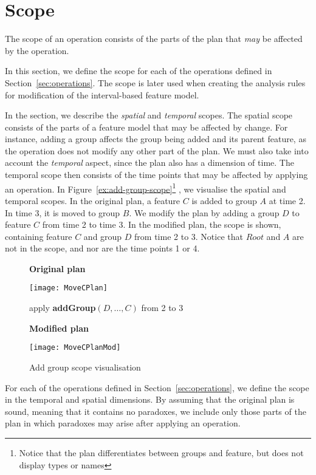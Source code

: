 
\section{Scope}
\label{sec:scope}

The scope of an operation consists of the parts of the plan that \emph{may} be affected by the operation.

In this section, we define the scope for each of the operations defined in Section~\vref{sec:operations}. The scope is later used when creating the analysis rules for modification of the interval-based feature model.

In the section, we describe the \emph{spatial} and \emph{temporal} scopes. The spatial scope consists of the parts of a feature model that may be affected by change. For instance, adding a group affects the group being added and its parent feature, as the operation does not modify any other part of the plan. We must also take into account the \emph{temporal} aspect, since the plan also has a dimension of time. The temporal scope then consists of the time points that may be affected by applying an operation. In Figure~\vref{ex:add-group-scope}\footnote{Notice that the plan differentiates between groups and feature, but does not display types or names} %
, we visualise the spatial and temporal scopes. In the original plan, a feature $C$ is added to group $A$ at time 2. In time 3, it is moved to group $B$. We modify the plan by adding a group $D$ to feature $C$ from time 2 to time 3. In the modified plan, the scope is shown, containing feature $C$ and group $D$ from time 2 to 3. Notice that $Root$ and $A$ are not in the scope, and nor are the time points 1 or 4.
\begin{figure}[h]
  \centering
      \textbf{Original plan}

      \texttt{[image: MoveCPlan]}
      \bigskip
      
      apply \textbf{addGroup}$(D, \ldots, C)$ from 2 to 3  
      \bigskip

      \textbf{Modified plan}

      \texttt{[image: MoveCPlanMod]}
  \caption{Add group scope visualisation}
  \label{ex:add-group-scope}
\end{figure}

For each of the operations defined in Section~\vref{sec:operations}, we define the scope in the temporal and spatial dimensions. By assuming that the original plan is sound, meaning that it contains no paradoxes, we include only those parts of the plan in which paradoxes may arise after applying an operation.

